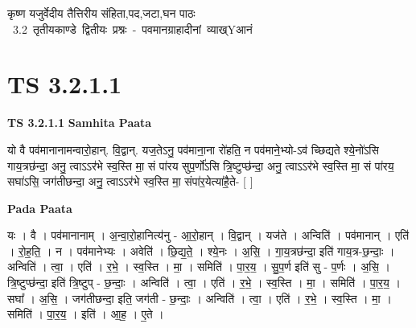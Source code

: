 \documentclass[17pt]{extarticle}
\begin{document}
\begin{titlepage}
    \begin{center}
 
\begin{sanskrit}
    { \Huge
    कृष्ण यजुर्वेदीय तैत्तिरीय संहिता,पद,जटा,घन पाठः 
    }
    \\
    \vspace{2.5cm}
    \mbox{ \Huge
    3.2     तृतीयकाण्डे द्वितीयः प्रश्नः - पवमानग्राहादीनां व्याख्Yआनं   }
\end{sanskrit}
\end{center}

\end{titlepage}
\tableofcontents
\pagebreak

\section*{ TS 3.2.1.1 }

\textbf{TS 3.2.1.1 } \newline
\textbf{Samhita Paata} \newline

यो वै पव॑मानानामन्वारो॒हान्. वि॒द्वान्. यज॒तेऽनु॒ पव॑माना॒ना रो॑हति॒ न पव॑माने॒भ्यो-ऽव॑ च्छिद्यते श्ये॒नो॑ऽसि गाय॒त्रछ॑न्दा॒ अनु॒ त्वाऽऽर॑भे स्व॒स्ति मा॒ सं पा॑रय सुप॒र्णो॑ऽसि त्रि॒ष्टुप्छ॑न्दा॒ अनु॒ त्वाऽऽर॑भे स्व॒स्ति मा॒ सं पा॑रय॒ सघा॑ऽसि॒ जग॑तीछन्दा॒ अनु॒ त्वाऽऽर॑भे स्व॒स्ति मा॒ संपा॑र॒येत्या॑है॒ते- [  ] \newline

\textbf{Pada Paata} \newline

यः । वै । पव॑मानानाम् । अ॒न्वा॒रो॒हानित्य॑नु - आ॒रो॒हान् । वि॒द्वान् । यज॑ते । अन्विति॑ । पव॑मानान् । एति॑ । रो॒ह॒ति॒ । न । पव॑मानेभ्यः । अवेति॑ । छि॒द्य॒ते॒ । श्ये॒नः । अ॒सि॒ । गा॒य॒त्रछ॑न्दा॒ इति॑ गाय॒त्र-छ॒न्दाः॒ । अन्विति॑ । त्वा॒ । एति॑ । र॒भे॒ । स्व॒स्ति । मा॒ । समिति॑ । पा॒र॒य॒ । सु॒प॒र्ण इति॑ सु - प॒र्णः । अ॒सि॒ । त्रि॒ष्टुप्छ॑न्दा॒ इति॑ त्रि॒ष्टुप् - छ॒न्दाः॒ । अन्विति॑ । त्वा॒ । एति॑ । र॒भे॒ । स्व॒स्ति । मा॒ । समिति॑ । पा॒र॒य॒ । सघा᳚ । अ॒सि॒ । जग॑तीछन्दा॒ इति॒ जग॑ती - छ॒न्दाः॒ । अन्विति॑ । त्वा॒ । एति॑ । र॒भे॒ । स्व॒स्ति । मा॒ । समिति॑ । पा॒र॒य॒ । इति॑ । आ॒ह॒ । ए॒ते ।  \newline




\end{document}
